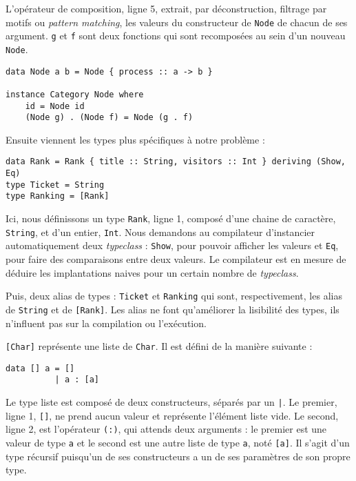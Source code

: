 \documentclass{llncs}
\begin{document}
L'opérateur de composition, ligne 5, extrait, par déconstruction, filtrage par motifs
ou \emph{pattern matching}, les valeurs du constructeur de \lstinline{Node} de chacun de ses argument.
\lstinline{g} et \lstinline{f} sont deux fonctions qui sont recomposées au sein
d'un nouveau \lstinline{Node}.

\begin{lstlisting}
data Node a b = Node { process :: a -> b }

instance Category Node where
    id = Node id
    (Node g) . (Node f) = Node (g . f)
\end{lstlisting}

Ensuite viennent les types plus spécifiques à notre problème :

\begin{lstlisting}
data Rank = Rank { title :: String, visitors :: Int } deriving (Show, Eq)
type Ticket = String
type Ranking = [Rank]
\end{lstlisting}

Ici, nous définissons un type \lstinline{Rank}, ligne 1,
composé d'une chaine de caractère, \lstinline{String}, et d'un entier, \lstinline{Int}.
Nous demandons au compilateur d'instancier automatiquement deux \emph{typeclass} :
\lstinline{Show}, pour pouvoir afficher les valeurs et \lstinline{Eq},
pour faire des comparaisons entre deux valeurs.
Le compilateur est en mesure de déduire les implantations naives pour un certain
nombre de \emph{typeclass}.

Puis, deux alias de types : \lstinline{Ticket} et \lstinline{Ranking} qui sont,
respectivement, les alias de \lstinline{String} et de \lstinline{[Rank]}.
Les alias ne font qu'améliorer la lisibilité des types, ils n'influent pas sur
la compilation ou l'exécution.

\lstinline{[Char]} représente une liste de \lstinline{Char}.
Il est défini de la manière suivante :
\begin{lstlisting}
data [] a = []
          | a : [a]
\end{lstlisting}

Le type liste est composé de deux constructeurs, séparés par un \lstinline{|}.
Le premier, ligne 1, \lstinline{[]}, ne prend aucun valeur et représente l'élément
liste vide.
Le second, ligne 2, est l'opérateur \lstinline{(:)}, qui attends deux arguments :
le premier est une valeur de type \lstinline{a} et le second est une autre liste de
type \lstinline{a}, noté \lstinline{[a]}.
Il s'agit d'un type récursif puisqu'un de ses constructeurs a un de ses paramètres
de son propre type.
\end{document}
